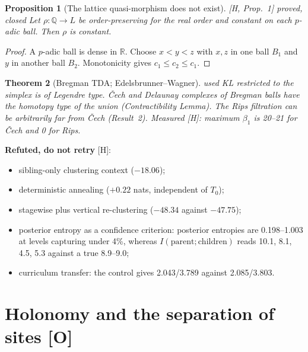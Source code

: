 \documentclass[11pt]{article}
\newtheorem{theorem}{Theorem}[section]
\newtheorem{proposition}[theorem]{Proposition}
\theoremstyle{definition}
\theoremstyle{remark}
\newcommand{\Q}{\mathbb{Q}}
\newcommand{\R}{\mathbb{R}}
\newcommand{\src}[1]{\textsf{\small[#1]}}
\newcommand{\st}[1]{\textsf{\small\color{gray}#1}}
\begin{document}
\begin{proposition}[The lattice quasi-morphism does not exist]\label{prop:padic}
\src{H, Prop.~1} \st{proved, closed}
Let $\rho:\Q\to L$ be order-preserving for the real order and constant on each $p$-adic ball. Then $\rho$ is constant.
\end{proposition}
\begin{proof}
A $p$-adic ball is dense in $\R$. Choose $x<y<z$ with $x,z$ in one ball $B_1$ and $y$ in another ball $B_2$. Monotonicity gives $c_1\le c_2\le c_1$.
\end{proof}
\begin{theorem}[Bregman TDA; Edelsbrunner--Wagner]\label{thm:ew}\st{used}
KL restricted to the simplex is of Legendre type. \v{C}ech and Delaunay complexes of Bregman balls have the homotopy type of the union (Contractibility Lemma). The Rips filtration can be arbitrarily far from \v{C}ech (Result~2). Measured \src{H}: maximum $\beta_1$ is 20--21 for \v{C}ech and 0 for Rips.
\end{theorem}

\noindent\textbf{Refuted, do not retry} \src{H}:
\begin{itemize}
  \item sibling-only clustering context ($-18.06$);
  \item deterministic annealing ($+0.22$ nats, independent of $T_0$);
  \item stagewise plus vertical re-clustering ($-48.34$ against $-47.75$);
  \item posterior entropy as a confidence criterion: posterior entropies are 0.198--1.003 at levels capturing under 4\%, whereas $I(\text{parent};\text{children})$ reads 10.1, 8.1, 4.5, 5.3 against a true 8.9--9.0;
  \item curriculum transfer: the control gives 2.043/3.789 against 2.085/3.803.
\end{itemize}

\part{Holonomy and the separation of sites \src{O}}
\end{document}
